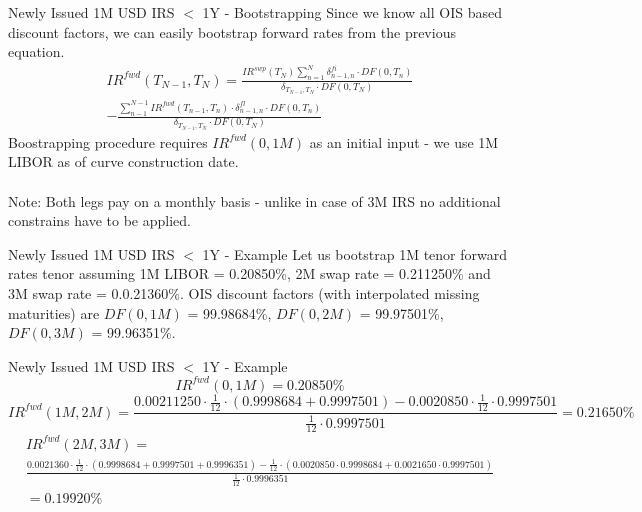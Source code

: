 \documentclass{beamer}
\newcommand\applyFontA{\fontsize{6}{6}\selectfont}
\begin{document}
\begin{frame}{Newly Issued 1M USD IRS $<$ 1Y - Bootstrapping}
Since we know all OIS based discount factors, we can easily bootstrap forward rates from the previous equation.
\begin{multline*}
IR^{fwd}(T_{N - 1}, T_N) = \frac{IR^{swp}(T_N) \sum_{n = 1}^N \delta_{n - 1, n}^{fi} \cdot DF(0, T_n)}{\delta_{T_{N - 1}, T_N} \cdot DF(0, T_N)} \\
- \frac{\sum_{n - 1}^{N - 1} IR^{fwd}(T_{n - 1}, T_n) \cdot \delta_{n - 1, n}^{fl} \cdot DF(0, T_n)}{\delta_{T_{N - 1}, T_N} \cdot DF(0, T_N)}
\end{multline*}
Boostrapping procedure requires $IR^{fwd}(0, 1M)$ as an initial input - we use 1M LIBOR as of curve construction date.
\\~\\
Note: Both legs pay on a monthly basis - unlike in case of 3M IRS no additional constrains have to be applied.
\end{frame}

\begin{frame}{Newly Issued 1M USD IRS $<$ 1Y - Example}
Let us bootstrap 1M tenor forward rates tenor assuming 1M LIBOR = 0.20850\%, 2M swap rate = 0.211250\% and 3M swap rate = 0.0.21360\%. OIS discount factors (with interpolated missing maturities) are $DF(0, 1M)$ = 99.98684\%, $DF(0, 2M)$ = 99.97501\%, $DF(0, 3M)$ = 99.96351\%.
\end{frame}

\begin{frame}{Newly Issued 1M USD IRS $<$ 1Y - Example}
\applyFontA
\begin{equation*}
IR^{fwd}(0, 1M) = 0.20850\%
\end{equation*}
\begin{equation*}
IR^{fwd}(1M, 2M) = \frac{0.00211250 \cdot \frac{1}{12} \cdot (0.9998684 + 0.9997501) - 0.0020850 \cdot \frac{1}{12} \cdot 0.9997501}{\frac{1}{12} \cdot 0.9997501} = 0.21650\%
\end{equation*}
\begin{multline*}
IR^{fwd}(2M, 3M) =\\
\frac{0.0021360 \cdot \frac{1}{12} \cdot (0.9998684 + 0.9997501 + 0.9996351) - \frac{1}{12} \cdot (0.0020850 \cdot 0.9998684 + 0.0021650 \cdot 0.9997501)}{\frac{1}{12} \cdot 0.9996351}\\
= 0.19920\%
\end{multline*}
\end{frame}
\end{document}
